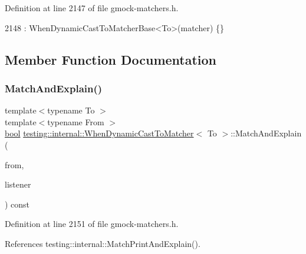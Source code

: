 Definition at line 2147 of file gmock-\/matchers.\+h.


\begin{DoxyCode}
2148       : WhenDynamicCastToMatcherBase<To>(matcher) \{\}
\end{DoxyCode}


\subsection{Member Function Documentation}
\mbox{\label{classtesting_1_1internal_1_1WhenDynamicCastToMatcher_a270f6a1e6ad7c9b69fdefca27c513bf5}} 
\subsubsection{\texorpdfstring{Match\+And\+Explain()}{MatchAndExplain()}}
{\footnotesize\ttfamily template$<$typename To $>$ \\
template$<$typename From $>$ \\
\hyperlink{classbool}{bool} \hyperlink{classtesting_1_1internal_1_1WhenDynamicCastToMatcher}{testing\+::internal\+::\+When\+Dynamic\+Cast\+To\+Matcher}$<$ To $>$\+::Match\+And\+Explain (\begin{DoxyParamCaption}\item[{From}]{from,  }\item[{\hyperlink{classtesting_1_1MatchResultListener}{Match\+Result\+Listener} $\ast$}]{listener }\end{DoxyParamCaption}) const\hspace{0.3cm}{\ttfamily [inline]}}



Definition at line 2151 of file gmock-\/matchers.\+h.



References testing\+::internal\+::\+Match\+Print\+And\+Explain().


